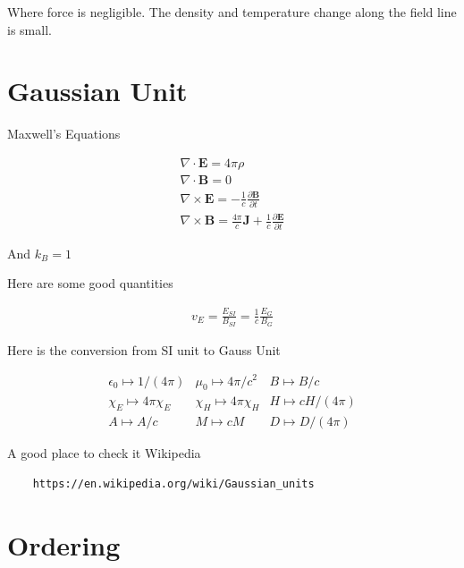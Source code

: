 Where force is negligible. The density and temperature change along the field line is small. 

\section{Gaussian Unit \label{sec:gauss}}

Maxwell's Equations

\begin{equation}
\begin{array}{l}
{\nabla \cdot \mathbf{E}=4 \pi \rho} \\ 
{\nabla \cdot \mathbf{B}=0} \\ 
{\nabla \times \textbf{E} = -\frac{1}{c}\frac{\partial \textbf{B}}{\partial t}}\\
{\nabla \times \mathbf{B}=\frac{4 \pi}{c} \mathbf{J}+\frac{1}{c} \frac{\partial \mathbf{E}}{\partial t}}
\end{array}
\end{equation}

And $k_B=1$

Here are some good quantities

\begin{eqnarray}
 v_E=\frac{E_{SI}}{B_{SI}}=\frac{1}{c}\frac{E_G}{B_G}
\end{eqnarray}

Here is the conversion from SI unit to Gauss Unit\cite{Handbook}

\begin{equation}
\begin{array}{lll}{\epsilon_{0} \mapsto 1 /(4 \pi)} & {\mu_{0} \mapsto 4 \pi / c^{2}} & {B \mapsto B / c} \\ {\chi_{E} \mapsto 4 \pi \chi_{E}} & {\chi_{H} \mapsto 4 \pi \chi_{H}} & {H \mapsto c H /(4 \pi)} \\ {A \mapsto A / c} & {M \mapsto c M} & {D \mapsto D /(4 \pi)}\end{array}
\end{equation}

A good place to check it Wikipedia 

\begin{verbatim}
    https://en.wikipedia.org/wiki/Gaussian_units
\end{verbatim}

\section{Ordering}


